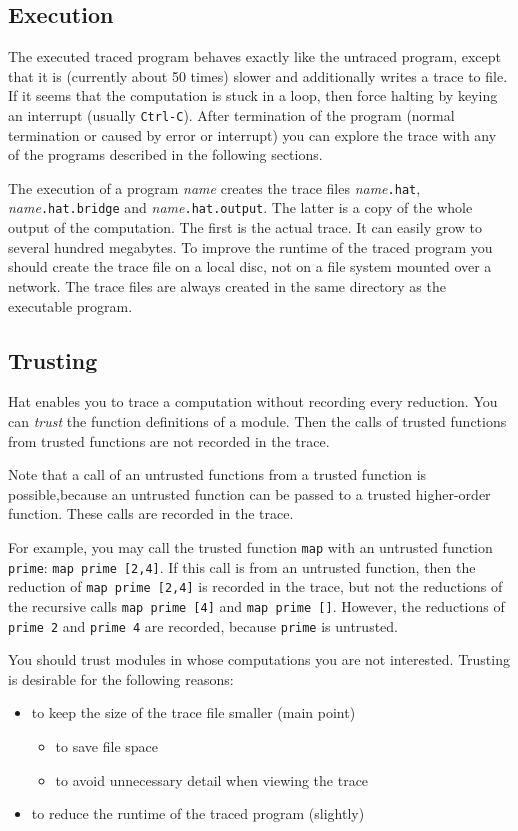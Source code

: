 \documentclass[12pt]{article}
\begin{document}
\subsection{Execution}

The executed traced program behaves exactly like the untraced program, except that it is (currently about 50 times) slower and additionally writes a trace to file. 
If it seems that the computation is stuck in a loop, then
force halting by keying an interrupt
(usually \texttt{Ctrl-C}).
After termination of the program (normal termination or caused by error or interrupt) you can explore the trace with any of the programs described in the following sections.

The execution of a program \emph{name} creates the trace files \emph{name}\texttt{.hat}, \emph{name}\texttt{.hat.bridge} and \emph{name}\texttt{.hat.output}. The latter is a copy of the whole output of the computation. The first is the actual trace. It can easily grow to several hundred megabytes. To improve the runtime of the traced program you should create the trace file on a local disc, not on a file system mounted over a network. The trace files are always created in the same directory as the executable program.


\subsection{Trusting}

Hat enables you to trace a computation without recording every reduction. 
You can \emph{trust} the function definitions of a module. Then the calls of trusted functions from trusted functions are not recorded in the trace.

Note that a call of an untrusted functions from a trusted function is possible,because an untrusted function can be passed to a trusted higher-order function. These calls are recorded in the trace.

For example, you may call the trusted function \texttt{map} with an untrusted function \texttt{prime}: \texttt{map prime [2,4]}. If this call is from an untrusted function, then the reduction of \texttt{map prime [2,4]} is recorded in the trace, but not the reductions of the recursive calls \texttt{map prime [4]} and \texttt{map prime []}. However, the reductions of \texttt{prime 2} and \texttt{prime 4} are recorded, because \texttt{prime} is untrusted.

You should trust modules in whose computations you are not interested.
Trusting is desirable for the following reasons:
\begin{itemize}
\item to keep the size of the trace file smaller (main point)
\begin{itemize}
\item to save file space
\item to avoid unnecessary detail when viewing the trace
\end{itemize}
\item to reduce the runtime of the traced program (slightly)
\end{itemize}
\end{document}
